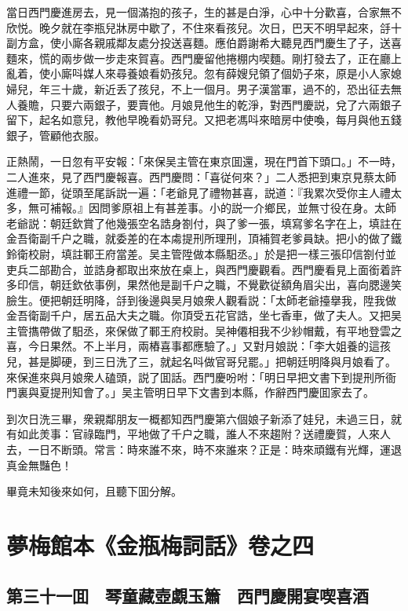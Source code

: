 當日西門慶進房去，見一個滿抱的孩子，生的甚是白淨，心中十分歡喜，合家無不欣悦。晚夕就在李瓶兒牀房中歇了，不住來看孩兒。次日，巴天不明早起來，㧱十副方盒，使小廝各親戚鄰友處分投送喜麵。應伯爵謝希大聽見西門慶生了子，送喜麵來，慌的兩步做一步走來賀喜。西門慶留他捲棚内喫麵。剛打發去了，正在廳上亂着，使小廝呌媒人來尋養娘看奶孩兒。忽有薛嫂兒領了個奶子來，原是小人家媳婦兒，年三十歲，新近丢了孩兒，不上一個月。男子漢當軍，過不的，恐出征去無人養贍，只要六兩銀子，要賣他。月娘見他生的乾淨，對西門慶説，兌了六兩銀子留下，起名如意兒，教他早晚看奶哥兒。又把老馮呌來暗房中使喚，每月與他五錢銀子，管顧他衣服。

正熱鬧，一日忽有平安報：「來保吴主管在東京囬還，現在門首下頭口。」不一時，二人進來，見了西門慶報喜。西門慶問：「喜従何來？」二人悉把到東京見蔡太師進禮一節，従頭至尾訴説一遍：「老爺見了禮物甚喜，説道：『我累次受你主人禮太多，無可補報。』因問爹原祖上有甚差事。小的説一介鄉民，並無寸役在身。太師老爺説：朝廷欽賞了他幾張空名誥身劄付，與了爹一張，填寫爹名字在上，填註在金吾衛副千户之職，就委差的在本䖏提刑所理刑，頂補賀老爹員缺。把小的做了鐵鈴衛校尉，填註鄆王府當差。吴主管陞做本縣馹丞。」於是把一樣三張印信劄付並吏兵二部勘合，並誥身都取出來放在桌上，與西門慶觀看。西門慶看見上面銜着許多印信，朝廷欽依事例，果然他是副千户之職，不覺歡従額角眉尖出，喜向腮邊笑臉生。便把朝廷明降，㧱到後邊與吴月娘衆人觀看説：「太師老爺擡擧我，陞我做金吾衛副千户，居五品大夫之職。你頂受五花官誥，坐七香車，做了夫人。又把吴主管㩦帶做了馹丞，來保做了鄆王府校尉。吴神僊相我不少紗帽戴，有平地登雲之喜，今日果然。不上半月，兩樁喜事都應驗了。」又對月娘説：「李大姐養的這孩兒，甚是脚硬，到三日洗了三，就起名呌做官哥兒罷。」把朝廷明降與月娘看了。來保進來與月娘衆人磕頭，説了囬話。西門慶吩咐：「明日早把文書下到提刑所衙門裏與夏提刑知會了。」吴主管明日早下文書到本縣，作辭西門慶囬家去了。

到次日洗三畢，衆親鄰朋友一概都知西門慶第六個娘子新添了娃兒，未過三日，就有如此羙事：官祿臨門，平地做了千户之職，誰人不來趨附？送禮慶賀，人來人去，一日不断頭。常言：時來誰不來，時不來誰來？正是：時來頑鐵有光輝，運退真金無豔色！

畢竟未知後來如何，且聽下囬分解。

\part*{夢梅館本《金瓶梅詞話》卷之四}

\chapter*{第三十一囬　琴童藏壺覷玉簫　西門慶開宴喫喜酒}

